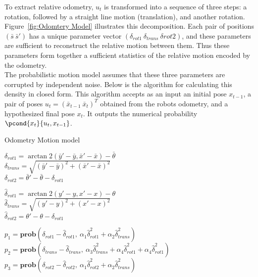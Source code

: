 To extract relative odometry, $u_t$ is transformed into a sequence of three steps: a rotation, followed by a straight line motion (translation), and another rotation.
Figure~\ref{fig:Odomtery Model} illustrates this decomposition. Each pair of positions $(\bar{s} \ \bar{s}')$ has a unique parameter vector $(\delta_{rot1} \ \delta_{trans} \ \delta{rot2})$, and these parameters are sufficient to reconstruct the relative motion between them.
Thus these parameters form together a sufficient statistics of the relative motion encoded by the odometry. \\

The probabilistic motion model assumes that these three parameters are corrupted by independent noise. Below is the algorithm for calculating this density in closed form.
This algorithm accepts as an input an initial pose $x_{t-1}$, a pair of poses $u_t = (\bar{x}_{t-1}\ \bar{x}_t)^T$ obtained from the robots odometry, and a hypothesized final pose $x_t$.
It outputs the numerical probability $\pcond{x_t}{u_t, x_{t-1}}$.

\begin{algorithm}[H]
\caption{Odometry Motion model}

\BlankLine
$\delta_{rot1} = \arctan2(\bar{y}' - \bar{y}, \bar{x}' - \bar{x}) - \bar{\theta}$\\
$\delta_{trans} = \sqrt{(\bar{y}' - \bar{y})^2+(\bar{x}' - \bar{x})^2}$\\
$\delta_{rot2} = \bar{\theta}' - \bar{\theta} - \delta_{rot1}$\\

\BlankLine

$\hat{\delta}_{rot1} = \arctan2(y' - y, x' - x) - \theta$\\
$\hat{\delta}_{trans} = \sqrt{(y' - y)^2+(x' - x)^2}$\\
$\hat{\delta}_{rot2} = \theta' - \theta - \delta_{rot1}$\\

\BlankLine

$p_1 = \mathbf{prob}(\delta_{rot1} - \hat{\delta}_{rot1},\ \alpha_1 \hat{\delta}_{rot1}^2 + \alpha_2 \hat{\delta}_{trans}^2)$\\
$p_2 = \mathbf{prob}(\delta_{trans} - \hat{\delta}_{trans},\ \alpha_3 \hat{\delta}_{trans}^2 + \alpha_4 \hat{\delta}_{rot1}^2 + \alpha_4 \hat{\delta}_{rot1}^2)$\\
$p_3 = \mathbf{prob}(\delta_{rot2} - \hat{\delta}_{rot2},\ \alpha_1 \hat{\delta}_{rot2}^2 + \alpha_2 \hat{\delta}_{trans}^2)$\\

\end{algorithm}


